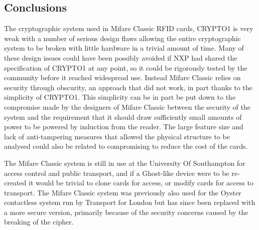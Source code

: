 \documentclass[pdflatex, a4paper,12pt]{article}
\begin{document}
\subsection{Conclusions}

The cryptographic system used in Mifare Classic RFID cards, CRYPTO1 is very
weak with a number of serious design flaws allowing the entire cryptographic
system to be broken with little hardware in a trivial amount of time. Many of
these design issues could have been possibly avoided if NXP had shared the specification of
CRYPTO1 at any point, so it could be rigorously tested by the community before
it reached widespread use. Instead Mifare Classic relies on security through
obscurity, an approach that did not work, in part thanks to the simplicity of
CRYPTO1. This simplicity can be in part be put down to the compromise made by
the designers of Mifare Classic between the security of the system and the
requirement that it should draw sufficiently small amounts of power to be
powered by induction from the reader. The large feature size and lack of
anti-tampering measures that allowed the
physical structure to be analysed could also be related to compromising to
reduce the cost of the cards.

The Mifare Classic system is still in use at the University Of Southampton for
access control and public transport, and if a Ghost-like device were to be
re-created it would be trivial to clone cards for access, or modify cards for
access to transport. The Mifare Classic system was previously also used for the
Oyster contactless system run by Transport for London but has since been replaced
with a more secure version, primarily because of the security concerns caused by
the breaking of the cipher.

\newpage

{}
\end{document}
